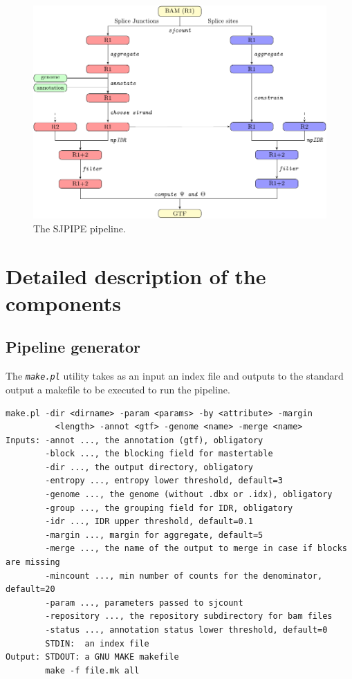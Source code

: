 \documentclass{article}
\newcommand{\prog}[1]{{\tt\em #1}}
\begin{document}
\begin{figure}
\centering
\includegraphics[width=\textwidth]{latex/fig1_crop.pdf}
\caption{The SJPIPE pipeline.\label{fig::sjpipe}}
\end{figure}


\section{Detailed description of the components}

\subsection{Pipeline generator}
The \prog{make.pl} utility takes as an input an index file and outputs to the standard output a makefile to be executed to run the pipeline.
\begin{verbatim} 
make.pl -dir <dirname> -param <params> -by <attribute> -margin 
          <length> -annot <gtf> -genome <name> -merge <name>
Inputs: -annot ..., the annotation (gtf), obligatory
        -block ..., the blocking field for mastertable
        -dir ..., the output directory, obligatory
        -entropy ..., entropy lower threshold, default=3
        -genome ..., the genome (without .dbx or .idx), obligatory
        -group ..., the grouping field for IDR, obligatory
        -idr ..., IDR upper threshold, default=0.1
        -margin ..., margin for aggregate, default=5
        -merge ..., the name of the output to merge in case if blocks are missing
        -mincount ..., min number of counts for the denominator, default=20
        -param ..., parameters passed to sjcount
        -repository ..., the repository subdirectory for bam files
        -status ..., annotation status lower threshold, default=0
        STDIN:  an index file 
Output: STDOUT: a GNU MAKE makefile
        make -f file.mk all
\end{verbatim} 
\end{document}
